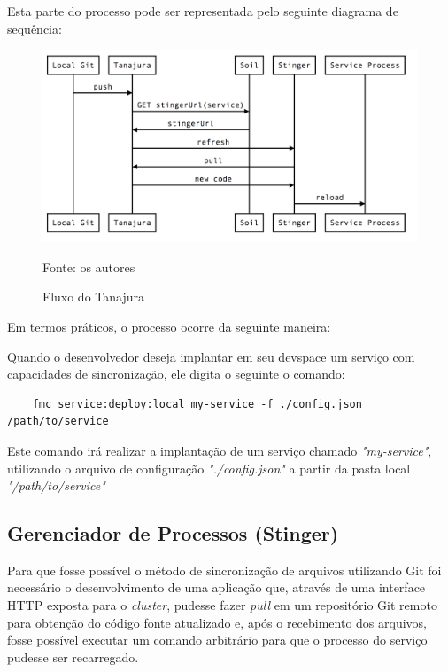 \documentclass[twosideprint]{politex}
\newcommand{\legend}[1]{\begin{center}\def\caption{}\caption{#1}\end{center}}
\begin{document}
	Esta parte do processo pode ser representada pelo seguinte diagrama de sequência:
		\begin{figure}[htb]
			\caption{\label{fig_arquitetura2}Fluxo do Tanajura}
			\begin{center}
			\includegraphics[scale=0.29]{pictures/tanajura-flow.png}
			\end{center}
			\legend{Fonte: os autores}
		\end{figure}

	Em termos práticos, o processo ocorre da seguinte maneira:
	
	Quando o desenvolvedor deseja implantar em seu devspace um serviço com capacidades de sincronização, ele digita o seguinte o comando:

	\begin{verbatim}
	fmc service:deploy:local my-service -f ./config.json /path/to/service
	\end{verbatim}

	Este comando irá realizar a implantação de um serviço chamado \textit{"my-service"}, utilizando o arquivo de configuração \textit{"./config.json"} a partir da pasta local \textit{"/path/to/service"}

	\subsection{Gerenciador de Processos (Stinger)}	
	
	Para que fosse possível o método de sincronização de arquivos utilizando Git foi necessário o desenvolvimento de uma aplicação que, através de uma interface HTTP exposta para o \textit{cluster}, pudesse fazer \textit{pull} em um repositório Git remoto para obtenção do código fonte atualizado e, após o recebimento dos arquivos, fosse possível executar um comando arbitrário para que o processo do serviço pudesse ser recarregado.
	
\end{document}
